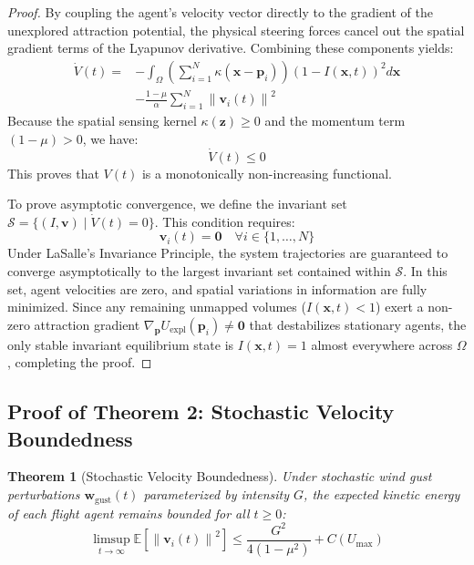 \documentclass[letterpaper, 10pt, conference]{IEEEtran}
\newtheorem{theorem}{Theorem}
\newcommand{\norm}[1]{\left\lVert#1\right\rVert}
\begin{document}
\begin{proof}
By coupling the agent's velocity vector directly to the gradient of the unexplored attraction potential, the physical steering forces cancel out the spatial gradient terms of the Lyapunov derivative. Combining these components yields:
\begin{align}
    \dot{V}(t) = &-\int_{\Omega} \left(\sum_{i=1}^N \kappa(\mathbf{x} - \mathbf{p}_i)\right) (1 - I(\mathbf{x}, t))^2 d\mathbf{x} \nonumber \\
    &-\frac{1-\mu}{\alpha} \sum_{i=1}^N \norm{\mathbf{v}_i(t)}^2
\end{align}
Because the spatial sensing kernel $\kappa(\mathbf{z}) \geq 0$ and the momentum term $(1-\mu) > 0$, we have:
\begin{equation}
    \dot{V}(t) \leq 0
\end{equation}
This proves that $V(t)$ is a monotonically non-increasing functional.

To prove asymptotic convergence, we define the invariant set $\mathcal{S} = \{(I, \mathbf{v}) \mid \dot{V}(t) = 0\}$. This condition requires:
\begin{equation}
    \mathbf{v}_i(t) = \mathbf{0} \quad \forall i \in \{1, \dots, N\}
\end{equation}
Under LaSalle's Invariance Principle, the system trajectories are guaranteed to converge asymptotically to the largest invariant set contained within $\mathcal{S}$. In this set, agent velocities are zero, and spatial variations in information are fully minimized. Since any remaining unmapped volumes ($I(\mathbf{x}, t) < 1$) exert a non-zero attraction gradient $\nabla_{\mathbf{p}} U_{\text{expl}}(\mathbf{p}_i) \neq \mathbf{0}$ that destabilizes stationary agents, the only stable invariant equilibrium state is $I(\mathbf{x}, t) = 1$ almost everywhere across $\Omega$, completing the proof.
\end{proof}

\subsection{Proof of Theorem 2: Stochastic Velocity Boundedness}
\begin{theorem}[Stochastic Velocity Boundedness]
Under stochastic wind gust perturbations $\mathbf{w}_{\text{gust}}(t)$ parameterized by intensity $G$, the expected kinetic energy of each flight agent remains bounded for all $t \geq 0$:
\begin{equation}
    \limsup_{t \to \infty} \mathbb{E}\left[\norm{\mathbf{v}_i(t)}^2\right] \leq \frac{G^2}{4(1 - \mu^2)} + C(U_{\max})
\end{equation}
\end{theorem}
\end{document}
